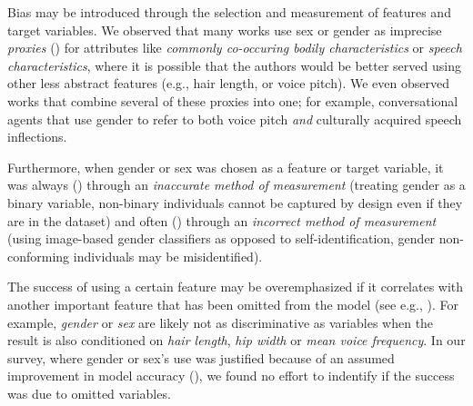 \documentclass[nonacm,sigconf,review,balance=false]{acmart}
\begin{document}
 Bias may be introduced through the selection and measurement of features and target variables.
We observed that many works use sex or gender as imprecise \emph{proxies} (\var) for attributes like \emph{commonly co-occuring bodily characteristics} or \emph{speech characteristics}, where it is possible that the authors would be better served using other less abstract features (e.g., hair length, or voice pitch). We even observed works that combine several of these proxies into one; for example,
conversational agents that use gender to refer to both voice pitch \emph{and} culturally acquired speech inflections.

Furthermore, when gender or sex was chosen as a feature or target variable, it was always (\binary) through an \emph{inaccurate method of measurement} (treating gender as a binary variable, non-binary individuals cannot be captured by design even if they are in the dataset) and often (\classifier) through an \emph{incorrect method of measurement} (using image-based gender classifiers as opposed to self-identification, gender non-conforming individuals may be misidentified).

 The success of using a certain feature may be overemphasized if it correlates with another important feature that has been omitted from the model (see e.g., \cite{clarke2005phantom}). For example, \emph{gender} or \emph{sex} are likely not as discriminative as variables when the result is also conditioned on \emph{hair length}, \emph{hip width} or \emph{mean voice frequency}. In our survey, where gender or sex's use was justified because of an assumed improvement in model accuracy (\var), we found no effort to indentify if the success was due to omitted variables.
\end{document}
